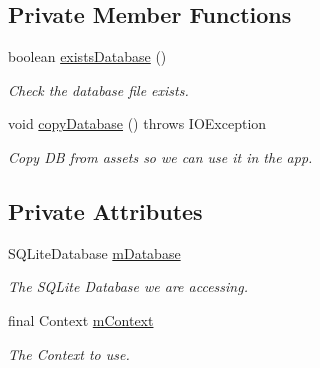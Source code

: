 \subsection*{Private Member Functions}
\begin{DoxyCompactItemize}
\item 
boolean \hyperlink{classuk_1_1ac_1_1swan_1_1digitaltrails_1_1database_1_1_database_handler_a07f9f99ed804c2930e60ddc4677bb41f}{exists\+Database} ()
\begin{DoxyCompactList}\small\item\em Check the database file exists. \end{DoxyCompactList}\item 
void \hyperlink{classuk_1_1ac_1_1swan_1_1digitaltrails_1_1database_1_1_database_handler_a882cc7a10f91402e51928d1d7dc8fb95}{copy\+Database} ()  throws I\+O\+Exception 
\begin{DoxyCompactList}\small\item\em Copy D\+B from assets so we can use it in the app. \end{DoxyCompactList}\end{DoxyCompactItemize}
\subsection*{Private Attributes}
\begin{DoxyCompactItemize}
\item 
S\+Q\+Lite\+Database \hyperlink{classuk_1_1ac_1_1swan_1_1digitaltrails_1_1database_1_1_database_handler_a20f6dc13104636d3be5dd1433020b5dc}{m\+Database}
\begin{DoxyCompactList}\small\item\em The S\+Q\+Lite Database we are accessing. \end{DoxyCompactList}\item 
final Context \hyperlink{classuk_1_1ac_1_1swan_1_1digitaltrails_1_1database_1_1_database_handler_ac37b8a11a4e6c0dc464553464ad2039c}{m\+Context}
\begin{DoxyCompactList}\small\item\em The Context to use. \end{DoxyCompactList}\end{DoxyCompactItemize}
